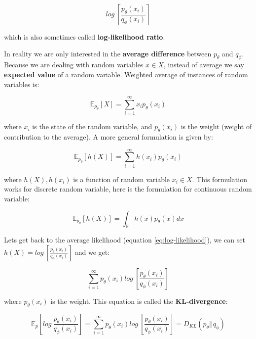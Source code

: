 \begin{equation}
\label{eq:log-likelihood}
    log\ [\frac{p_\theta(x_i)}{q_\phi(x_i)}]
\end{equation}

which is also sometimes called \textbf{log-likelihood ratio}.

In reality we are only interested in the \textbf{average difference} between $p_\theta$ and $q_\phi$. Because we are dealing with random variables $x \in X$, instead of average we say \textbf{expected value} of a random variable. Weighted average of instances of random variables is:

\begin{equation*}
    \mathbb{E}_{p_\theta} [X] = \sum_{i=1}^{\infty} x_i p_\theta(x_i)
\end{equation*}

where $x_i$ is the state of the random variable, and $p_\theta(x_i)$ is the weight (weight of contribution to the average). A more general formulation is given by:

\begin{equation*}
    \mathbb{E}_{p_\theta} [h(X)] = \sum_{i=1}^{\infty} h(x_i) p_\theta(x_i)
\end{equation*}

where $h(X), h(x_i)$ is a function of random variable $x_i \in X$. This formulation works for discrete random variable, here is the formulation for continuous random variable:

\begin{equation*}
    \mathbb{E}_{p_\theta} [h(X)] = \int_{\mathbb{R}} h(x) p_\theta(x) dx
\end{equation*}

Lets get back to the average likelihood (equation \ref{eq:log-likelihood}), we can set $h(X) = log\ [\frac{p_\theta(x_i)}{q_\phi(x_i)}]$ and we get:

\begin{equation*}
    \sum_{i=1}^{\infty} p_\theta(x_i) log\ [\frac{p_\theta(x_i)}{q_\phi(x_i)}]
\end{equation*}

where $p_\theta(x_i)$ is the weight. This equation is called the \textbf{KL-divergence}:

\begin{equation}
\label{eq:kl_divergence}
    \mathbb{E}_p [log\ \frac{p_\theta(x_i)}{q_\phi(x_i)}]
    =
    \sum_{i=1}^{\infty} p_\theta(x_i) log\ [\frac{p_\theta(x_i)}{q_\phi(x_i)}]
    =
    D_{KL} (p_\theta || q_\phi)
\end{equation}

